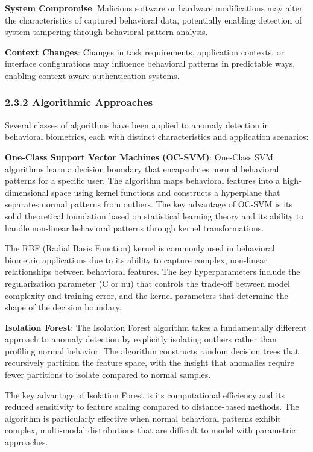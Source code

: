 \documentclass[
  11pt,
  a4paper,
]{article}
\begin{document}
\textbf{System Compromise}: Malicious software or hardware modifications
may alter the characteristics of captured behavioral data, potentially
enabling detection of system tampering through behavioral pattern
analysis.

\textbf{Context Changes}: Changes in task requirements, application
contexts, or interface configurations may influence behavioral patterns
in predictable ways, enabling context-aware authentication systems.

\subsubsection{2.3.2 Algorithmic
Approaches}\label{algorithmic-approaches}

Several classes of algorithms have been applied to anomaly detection in
behavioral biometrics, each with distinct characteristics and
application scenarios:

\textbf{One-Class Support Vector Machines (OC-SVM)}: One-Class SVM
algorithms learn a decision boundary that encapsulates normal behavioral
patterns for a specific user. The algorithm maps behavioral features
into a high-dimensional space using kernel functions and constructs a
hyperplane that separates normal patterns from outliers. The key
advantage of OC-SVM is its solid theoretical foundation based on
statistical learning theory and its ability to handle non-linear
behavioral patterns through kernel transformations.

The RBF (Radial Basis Function) kernel is commonly used in behavioral
biometric applications due to its ability to capture complex, non-linear
relationships between behavioral features. The key hyperparameters
include the regularization parameter (C or nu) that controls the
trade-off between model complexity and training error, and the kernel
parameters that determine the shape of the decision boundary.

\textbf{Isolation Forest}: The Isolation Forest algorithm takes a
fundamentally different approach to anomaly detection by explicitly
isolating outliers rather than profiling normal behavior. The algorithm
constructs random decision trees that recursively partition the feature
space, with the insight that anomalies require fewer partitions to
isolate compared to normal samples.

The key advantage of Isolation Forest is its computational efficiency
and its reduced sensitivity to feature scaling compared to
distance-based methods. The algorithm is particularly effective when
normal behavioral patterns exhibit complex, multi-modal distributions
that are difficult to model with parametric approaches.
\end{document}
